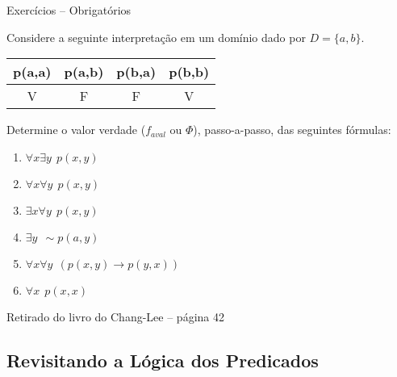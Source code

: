 \begin{frame}[t]{Exercícios -- Obrigatórios}

Considere a seguinte interpretação em um domínio dado por $D=\{a,b\}$. 

\begin{tabular}{c |c | c | c } \hline \hline 
p(a,a) & p(a,b)  & p(b,a) & p(b,b)  \\  \hline 
 V & F & F & V \\ \hline \hline 
\end{tabular}

Determine o valor verdade ($f_{aval}$  ou $\Phi $), passo-a-passo, das seguintes fórmulas:

\begin{enumerate}
\itemsep -1pt
\item $\forall x \exists y \:\: p(x,y) $
\item $\forall x \forall y \:\: p(x,y) $
\item $\exists x \forall y \:\: p(x,y) $
\item $\exists y \:\: \sim p(a,y) $
\item $\forall x \forall y \:\: (p(x,y) \rightarrow p(y,x)) $
\item $\forall x  \:\: p(x,x) $
\end{enumerate}
Retirado do livro do Chang-Lee -- página 42

	
	
\end{frame}




\subsection{Revisitando a Lógica dos Predicados}

